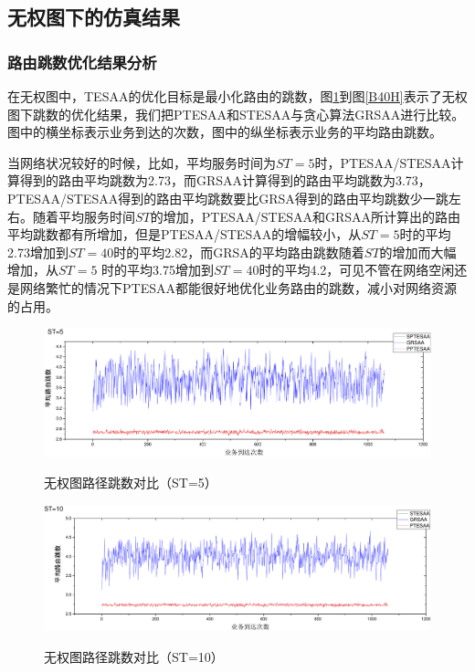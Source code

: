 \subsection{无权图下的仿真结果}
\subsubsection{路由跳数优化结果分析}

在无权图中，TESAA的优化目标是最小化路由的跳数，图\ref{B5H}到图\ref{B40H}表示了无权图下跳数的优化结果，我们把PTESAA和STESAA与贪心算法GRSAA进行比较。图中的横坐标表示业务到达的次数，图中的纵坐标表示业务的平均路由跳数。

当网络状况较好的时候，比如，平均服务时间为$ST=5$时，PTESAA/STESAA计算得到的路由平均跳数为2.73，而GRSAA计算得到的路由平均跳数为3.73，PTESAA/STESAA得到的路由平均跳数要比GRSA得到的路由平均跳数少一跳左右。随着平均服务时间$ST$的增加，PTESAA/STESAA和GRSAA所计算出的路由平均跳数都有所增加，但是PTESAA/STESAA的增幅较小，从$ST=5$时的平均2.73增加到$ST=40$时的平均2.82，而GRSA的平均路由跳数随着$ST$的增加而大幅增加，从$ST=5$ 时的平均3.75增加到$ST=40$时的平均4.2，可见不管在网络空闲还是网络繁忙的情况下PTESAA都能很好地优化业务路由的跳数，减小对网络资源的占用。
\begin{figure}
\setlength{\belowcaptionskip}{-1cm}
\begin{center}
{\includegraphics[width=1 \textwidth]{figures/B5H.pdf}}
\end{center}
\caption{{\footnotesize{无权图路径跳数对比（ST=5）}}}
\label{B5H}
\end{figure}
\begin{figure}
\vspace{-1cm}
\setlength{\belowcaptionskip}{-1cm}
\begin{center}
{\includegraphics[width=1 \textwidth]{figures/B10H.pdf}}
\end{center}
\caption{{\footnotesize{无权图路径跳数对比（ST=10）}}}
\label{B10H}
\end{figure}
